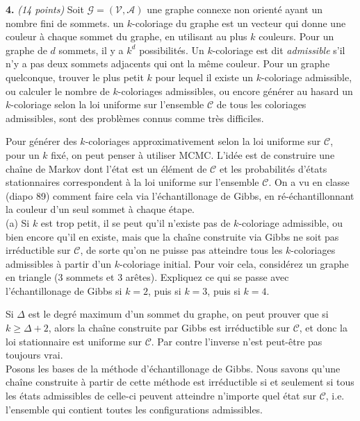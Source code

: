 \documentclass{article}
\begin{document}
\newpage
\noindent \textbf{4.} \textit{(14 points)} Soit 
$\mathcal{G}=(\mathcal{V},\mathcal{A})$ une graphe connexe non
orienté ayant un nombre fini de sommets. un $k$-coloriage du graphe 
est un vecteur qui donne une couleur à chaque sommet du graphe, en 
utilisant au plus $k$ couleurs. Pour un graphe de $d$ sommets, il y
a $k^d$ possibilités. Un $k$-coloriage est dit \textit{admissible} s'il
n'y a pas deux sommets adjacents qui ont la même couleur. Pour un graphe
quelconque, trouver le plus petit $k$ pour lequel il existe un 
$k$-coloriage admissible, ou calculer le nombre de $k$-coloriages
admissibles, ou encore générer au hasard un $k$-coloriage selon la loi
uniforme sur l'ensemble $\mathcal{C}$ de tous les coloriages admissibles,
sont des problèmes connus comme très difficiles.

\vspace{.2cm}
\noindent Pour générer des $k$-coloriages approximativement selon la 
loi uniforme sur $\mathcal{C}$, pour un $k$ fixé, on peut penser à
utiliser MCMC. L'idée est de construire une chaîne de Markov dont l'état
est un élément de $\mathcal{C}$ et les probabilités d'états stationnaires
correspondent à la loi uniforme sur l'ensemble $\mathcal{C}$. On a vu
en classe (diapo 89) comment faire cela via l'échantillonage de Gibbs,
en ré-échantillonnant la couleur d'un seul sommet à chaque étape. \\

\noindent (a) Si $k$ est trop petit, il se peut qu'il n'existe pas de
$k$-coloriage admissible, ou bien encore qu'il en existe, mais que la 
chaîne construite via Gibbs ne soit pas irréductible sur $\mathcal{C}$,
de sorte qu'on ne puisse pas atteindre tous les $k$-coloriages 
admissibles à partir d'un $k$-coloriage initial. Pour voir cela,
considérez un graphe en triangle (3 sommets et 3 arêtes). Expliquez
ce qui se passe avec l'échantillonage de Gibbs si $k=2$, puis si
$k=3$, puis si $k=4$.

\vspace{.2cm}
\noindent Si $\Delta$ est le degré maximum d'un sommet du graphe, on
peut prouver que si $k\ge\Delta +2$, alors la chaîne construite par 
Gibbs est irréductible sur $\mathcal{C}$, et donc la loi stationnaire
est uniforme sur $\mathcal{C}$. Par contre l'inverse n'est peut-être
pas toujours vrai. \\

Posons les bases de la méthode d'échantillonage de Gibbs. Nous savons 
qu'une chaîne construite à partir de cette méthode est irréductible
si et seulement si tous les états admissibles de celle-ci peuvent 
atteindre n'importe quel état sur $\mathcal{C}$, i.e. l'ensemble qui 
contient toutes les configurations admissibles.
\end{document}

